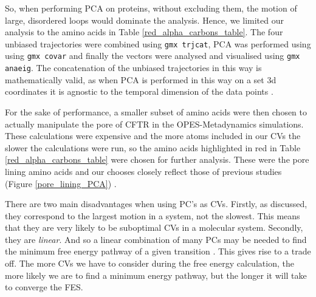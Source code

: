 So, when performing PCA on proteins, without excluding them, the motion of large, disordered loops would dominate the analysis. Hence, we limited our analysis to the amino acids in Table \ref{red_alpha_carbons_table}. The four unbiased trajectories were combined using \verb_gmx trjcat_, PCA was performed using using \verb_gmx covar_ and finally the vectors were analysed and visualised using \verb_gmx anaeig_. The concatenation of the unbiased trajectories in this way is mathematically valid, as when PCA is performed in this way on a set 3d coordinates it is agnostic to the temporal dimension of the data points \cite{}.

For the sake of performance, a smaller subset of amino acids were then chosen to actually manipulate the pore of CFTR in the OPES-Metadynamics simulations. These calculations were expensive and the more atoms included in our CVs the slower the calculations were run, so the amino acids highlighted in red in Table \ref{red_alpha_carbons_table} were chosen for further analysis. These were the pore lining amino acids and our chooses closely reflect those of previous studies (Figure \ref{pore_lining_PCA}) \cite{hoffmann2018}. 

There are two main disadvantages when using PC's as CVs. Firstly, as discussed, they correspond to the largest motion in a system, not the slowest. This means that they are very likely to be suboptimal CVs in a molecular system. Secondly, they are \textit{linear}. And so a linear combination of many PCs  may be needed to find the minimum free energy pathway of a given transition \cite{}. This gives rise to a trade off. The more CVs we have to consider during the free energy calculation, the more likely we are to find a minimum energy pathway, but the longer it will take to converge the FES.

